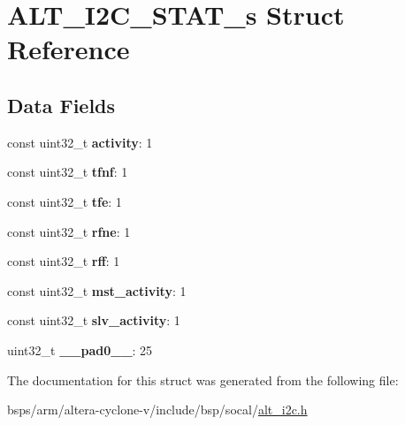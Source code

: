 \hypertarget{structALT__I2C__STAT__s}{}\section{A\+L\+T\+\_\+\+I2\+C\+\_\+\+S\+T\+A\+T\+\_\+s Struct Reference}
\label{structALT__I2C__STAT__s}
\subsection*{Data Fields}
\begin{DoxyCompactItemize}
\item 
\mbox{\label{structALT__I2C__STAT__s_a043d918025ef21050a1b6e0b3320dfbb}} 
const uint32\+\_\+t {\bfseries activity}\+: 1
\item 
\mbox{\label{structALT__I2C__STAT__s_a8390c04f31c37a4789a9478322e5d161}} 
const uint32\+\_\+t {\bfseries tfnf}\+: 1
\item 
\mbox{\label{structALT__I2C__STAT__s_a1da702c69498ffa63729351988b5c4b6}} 
const uint32\+\_\+t {\bfseries tfe}\+: 1
\item 
\mbox{\label{structALT__I2C__STAT__s_af24f05be1c5d1093c7c06ef6efb64254}} 
const uint32\+\_\+t {\bfseries rfne}\+: 1
\item 
\mbox{\label{structALT__I2C__STAT__s_a2826381074c509700951f669727df7b7}} 
const uint32\+\_\+t {\bfseries rff}\+: 1
\item 
\mbox{\label{structALT__I2C__STAT__s_ac56990ec5d9220c75549165e3f9044d6}} 
const uint32\+\_\+t {\bfseries mst\+\_\+activity}\+: 1
\item 
\mbox{\label{structALT__I2C__STAT__s_a05ce9f8da9be371f151686ea11efda9e}} 
const uint32\+\_\+t {\bfseries slv\+\_\+activity}\+: 1
\item 
\mbox{\label{structALT__I2C__STAT__s_a8f665355f64180b914091a1864f676ba}} 
uint32\+\_\+t {\bfseries \+\_\+\+\_\+pad0\+\_\+\+\_\+}\+: 25
\end{DoxyCompactItemize}


The documentation for this struct was generated from the following file\+:\begin{DoxyCompactItemize}
\item 
bsps/arm/altera-\/cyclone-\/v/include/bsp/socal/\mbox{\hyperlink{socal_2alt__i2c_8h}{alt\+\_\+i2c.\+h}}\end{DoxyCompactItemize}
